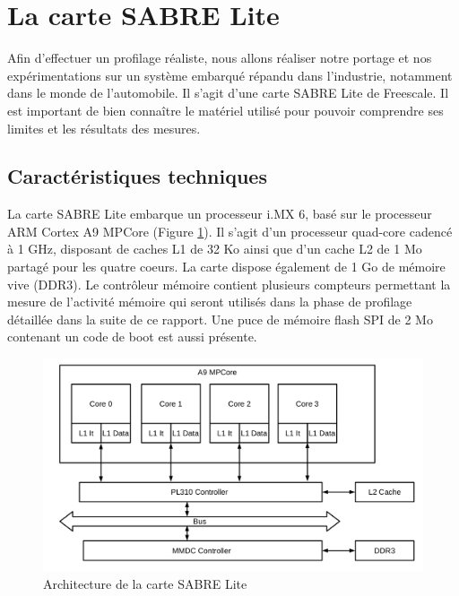 \section{La carte SABRE Lite}

Afin d'effectuer un profilage réaliste, nous allons réaliser notre portage et
nos expérimentations sur un système embarqué répandu dans l'industrie, notamment
dans le monde de l'automobile. Il s'agit d'une carte SABRE Lite
\cite{_i.mx_2014} de Freescale. Il est important de bien connaître le matériel
utilisé pour pouvoir comprendre ses limites et les résultats des mesures.

\subsection{Caractéristiques techniques}

La carte SABRE Lite embarque un processeur i.MX 6, basé sur le
processeur ARM Cortex A9 MPCore (Figure \ref{fig:archi}). Il s'agit d'un
processeur quad-core cadencé à 1 GHz, disposant de caches L1 de 32 Ko ainsi que
d'un cache L2 de 1 Mo partagé pour les quatre coeurs. La carte dispose également
de 1 Go de mémoire vive (DDR3). Le contrôleur mémoire contient plusieurs
compteurs permettant la mesure de l'activité mémoire qui seront utilisés dans la
phase de profilage détaillée dans la suite de ce rapport. Une puce de mémoire
flash SPI de 2 Mo contenant un code de boot est aussi présente.

\begin{figure}[H]
\centering
\includegraphics[scale=0.3]{include/sabrelite_archi.png}
\caption{Architecture de la carte SABRE Lite}
\label{fig:archi}
\end{figure}

